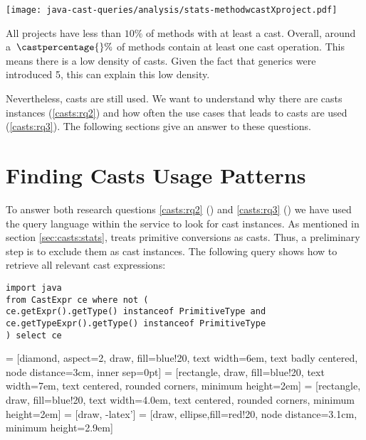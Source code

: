 \texttt{[image: java-cast-queries/analysis/stats-methodwcastXproject.pdf]}

All projects have less than $10\%$ of methods with at least a cast.
Overall, around a~$\castpercentage{}\%$ of methods contain at least one cast operation. 
This means there is a low density of casts.
Given the fact that generics were introduced \java{} 5, this can explain this low density.

Nevertheless, casts are still used.
We want to understand why there are casts instances (\ref{casts:rq2}) and
how often the use cases that leads to casts are used (\ref{casts:rq3}).
The following sections give an answer to these questions.


\section{Finding Casts Usage Patterns}
\label{sec:casts:methodology}

To answer both research questions
\ref{casts:rq2} (\emph{\crqB}) and \ref{casts:rq3} (\emph{\crqC})
we have used the \ql{} query language within the \lgtm{} service to look for cast instances.
%
As mentioned in section \ref{sec:casts:stats}, \ql{} treats primitive conversions as casts.
Thus, a preliminary step is to exclude them as cast instances.
The following \ql{} query shows how to retrieve all relevant cast expressions:

\begin{lstlisting}[style=ql,caption=\ql{} query to retrieve all relevant cast expressions.]
import java
from CastExpr ce where not (
ce.getExpr().getType() instanceof PrimitiveType and
ce.getTypeExpr().getType() instanceof PrimitiveType
) select ce
\end{lstlisting}

 = [diamond, aspect=2, draw, fill=blue!20, 
    text width=6em, text badly centered, node distance=3cm, inner sep=0pt]
 = [rectangle, draw, fill=blue!20, 
    text width=7em, text centered, rounded corners, minimum height=2em]
 = [rectangle, draw, fill=blue!20, 
    text width=4.0em, text centered, rounded corners, minimum height=2em]
 = [draw, -latex']
 = [draw, ellipse,fill=red!20, node distance=3.1cm,
    minimum height=2.9em]

